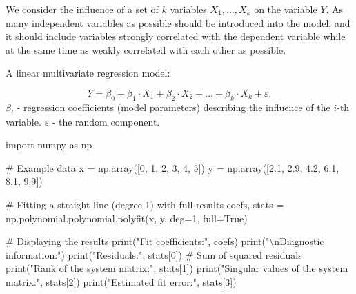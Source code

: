 \documentclass[
  english,
  letterpaper,
  DIV=11,
  numbers=noendperiod]{scrreprt}
\newenvironment{Shaded}{\begin{snugshade}}{\end{snugshade}}
\newcommand{\BuiltInTok}[1]{\textcolor[rgb]{0.00,0.23,0.31}{#1}}
\newcommand{\CharTok}[1]{\textcolor[rgb]{0.13,0.47,0.30}{#1}}
\newcommand{\CommentTok}[1]{\textcolor[rgb]{0.37,0.37,0.37}{#1}}
\newcommand{\DecValTok}[1]{\textcolor[rgb]{0.68,0.00,0.00}{#1}}
\newcommand{\FloatTok}[1]{\textcolor[rgb]{0.68,0.00,0.00}{#1}}
\newcommand{\ImportTok}[1]{\textcolor[rgb]{0.00,0.46,0.62}{#1}}
\newcommand{\NormalTok}[1]{\textcolor[rgb]{0.00,0.23,0.31}{#1}}
\newcommand{\OperatorTok}[1]{\textcolor[rgb]{0.37,0.37,0.37}{#1}}
\newcommand{\StringTok}[1]{\textcolor[rgb]{0.13,0.47,0.30}{#1}}
\newcommand{\VariableTok}[1]{\textcolor[rgb]{0.07,0.07,0.07}{#1}}
\begin{document}
We consider the influence of a set of \(k\) variables
\(X_1, \ldots, X_k\) on the variable \(Y\). As many independent
variables as possible should be introduced into the model, and it should
include variables strongly correlated with the dependent variable while
at the same time as weakly correlated with each other as possible.

A linear multivariate regression model:

\[Y=\beta_0 +\beta_1\cdot X_1+\beta_2\cdot X_2+\ldots+\beta_k\cdot X_k+\varepsilon.\]
\(\beta_i\) - regression coefficients (model parameters) describing the
influence of the \(i\)-th variable. \(\varepsilon\) - the random
component.

\begin{Shaded}
\begin{Highlighting}[]
\ImportTok{import}\NormalTok{ numpy }\ImportTok{as}\NormalTok{ np}

\CommentTok{\# Example data}
\NormalTok{x }\OperatorTok{=}\NormalTok{ np.array([}\DecValTok{0}\NormalTok{, }\DecValTok{1}\NormalTok{, }\DecValTok{2}\NormalTok{, }\DecValTok{3}\NormalTok{, }\DecValTok{4}\NormalTok{, }\DecValTok{5}\NormalTok{])}
\NormalTok{y }\OperatorTok{=}\NormalTok{ np.array([}\FloatTok{2.1}\NormalTok{, }\FloatTok{2.9}\NormalTok{, }\FloatTok{4.2}\NormalTok{, }\FloatTok{6.1}\NormalTok{, }\FloatTok{8.1}\NormalTok{, }\FloatTok{9.9}\NormalTok{])}

\CommentTok{\# Fitting a straight line (degree 1) with full results}
\NormalTok{coefs, stats }\OperatorTok{=}\NormalTok{ np.polynomial.polynomial.polyfit(x, y, deg}\OperatorTok{=}\DecValTok{1}\NormalTok{, full}\OperatorTok{=}\VariableTok{True}\NormalTok{)}

\CommentTok{\# Displaying the results}
\BuiltInTok{print}\NormalTok{(}\StringTok{"Fit coefficients:"}\NormalTok{, coefs)}
\BuiltInTok{print}\NormalTok{(}\StringTok{"}\CharTok{\textbackslash{}n}\StringTok{Diagnostic information:"}\NormalTok{)}
\BuiltInTok{print}\NormalTok{(}\StringTok{"Residuals:"}\NormalTok{, stats[}\DecValTok{0}\NormalTok{])  }\CommentTok{\# Sum of squared residuals}
\BuiltInTok{print}\NormalTok{(}\StringTok{"Rank of the system matrix:"}\NormalTok{, stats[}\DecValTok{1}\NormalTok{])}
\BuiltInTok{print}\NormalTok{(}\StringTok{"Singular values of the system matrix:"}\NormalTok{, stats[}\DecValTok{2}\NormalTok{])}
\BuiltInTok{print}\NormalTok{(}\StringTok{"Estimated fit error:"}\NormalTok{, stats[}\DecValTok{3}\NormalTok{])}
\end{Highlighting}
\end{Shaded}
\end{document}
